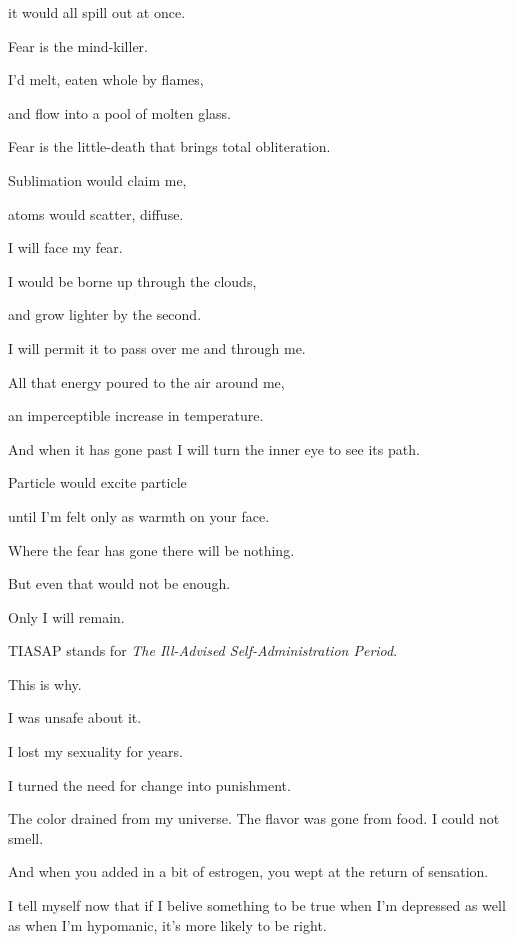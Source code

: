 \begin{paracol}{2}
\begin{leftcolumn}
it would all spill out at once.

\begin{ally}
Fear is the mind-killer.
\end{ally}
I'd melt, eaten whole by flames,

and flow into a pool of molten glass.

\begin{ally}
Fear is the little-death that brings total obliteration.
\end{ally}
Sublimation would claim me,

atoms would scatter, diffuse.

\begin{ally}
I will face my fear.
\end{ally}
I would be borne up through the clouds,

and grow lighter by the second.

\begin{ally}
I will permit it to pass over me and through me.
\end{ally}
All that energy poured to the air around me,

an imperceptible increase in temperature.

\begin{ally}
And when it has gone past I will turn the inner eye to see its path.
\end{ally}
Particle would excite particle

until I'm felt only as warmth on your face.

\begin{ally}
Where the fear has gone there will be nothing.
\end{ally}
But even that would not be enough.

\begin{ally}
Only I will remain.
\end{ally}
\newpage

\noindent TIASAP stands for \emph{The Ill-Advised Self-Administration Period}.

This is why.

I was unsafe about it.

I lost my sexuality for years.

I turned the need for change into punishment.

The color drained from my universe. The flavor was gone from food. I could not smell.

\begin{ally}
And when you added in a bit of estrogen, you wept at the return of sensation.
\end{ally}
I tell myself now that if I belive something to be true when I'm depressed as well as when I'm hypomanic, it's more likely to be right.


\end{leftcolumn}
\end{paracol}
